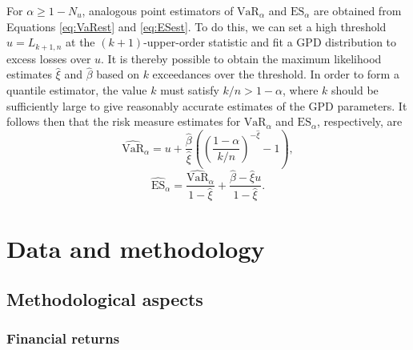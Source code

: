 \documentclass[a4paper,11pt]{article}
\theoremstyle{definition}
\theoremstyle{definition}
\theoremstyle{definition}
\theoremstyle{definition}
\theoremstyle{remark}
\begin{document}
For \(\alpha \geq 1 - N_u\), analogous point estimators of \(\text{VaR}_{\alpha}\) and \(\text{ES}_{\alpha}\) are obtained from Equations \eqref{eq:VaRest} and \eqref{eq:ESest}. To do this, we can set a high threshold \(u = L_{k+1, n}\) at the \((k+1)\)-upper-order statistic and fit a GPD distribution to excess losses over \(u\). It is thereby possible to obtain the maximum likelihood estimates \(\hat \xi\) and \(\hat \beta\) based on \(k\) exceedances over the threshold. In order to form a quantile estimator, the value \(k\) must satisfy \(k/n > 1 - \alpha\), where \(k\) should be sufficiently large to give reasonably accurate estimates of the GPD parameters. It follows then that the risk measure estimates for \(\text{VaR}_{\alpha}\) and \(\text{ES}_{\alpha}\), respectively, are
\begin{equation}
\widehat{\text{VaR}}_{\alpha} = u + \frac{\hat \beta}{\hat \xi}\left(\left( \frac{1-\alpha}{k/n} \right)^{- \hat \xi} -1 \right),
\label{eq:VaRestimate}
\end{equation}
\begin{equation}
\widehat{\text{ES}}_{\alpha} = \frac{\widehat{\text{VaR}}_{\alpha}}{1-\hat \xi} + \frac{\hat \beta - \hat \xi u}{1-\hat \xi}.
\label{eq:ESestimate}
\end{equation}
\hypertarget{sec:data}{%
\section{Data and methodology}\label{sec:data}}

\hypertarget{methodological-aspects}{%
\subsection{Methodological aspects}\label{methodological-aspects}}

\hypertarget{financial-returns}{%
\subsubsection{Financial returns}\label{financial-returns}}
\end{document}
